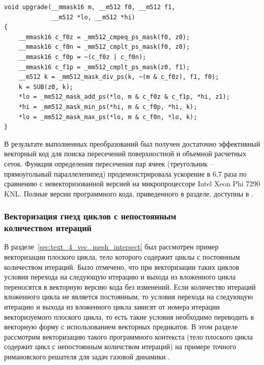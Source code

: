 \begin{singlespace}
\begin{lstlisting}[caption={Векторная реализация функции upgrade с пропагированным условием вызова внутрь функции.},label={lst:text_4_mesh_intersect_upgrade}]
void upgrade(__mmask16 m, __m512 f0, __m512 f1,
             __m512 *lo, __m512 *hi)
{
    __mmask16 c_f0z = _mm512_cmpeq_ps_mask(f0, z0);
    __mmask16 c_f0n = _mm512_cmplt_ps_mask(f0, z0);
    __mmask16 c_f0p = ~(c_f0z | c_f0n);
    __mmask16 c_f1p = _mm512_cmplt_ps_mask(z0, f1);
    __m512 k = _mm512_mask_div_ps(k, ~(m & c_f0z), f1, f0);
    k = SUB(z0, k);
    *lo = _mm512_mask_add_ps(*lo, m & c_f0z & c_f1p, *hi, z1);
    *hi = _mm512_mask_min_ps(*hi, m & c_f0p, *hi, k);
    *lo = _mm512_mask_max_ps(*lo, m & c_f0n, *lo, k);
}
\end{lstlisting}
\end{singlespace}

В результате выполненных преобразований был получен достаточно эффективный векторный код для поиска пересечений поверхностной и объемной расчетных сеток.
Функция определения пересечения пар ячеек (треугольник -- прямоугольный параллелепипед) продемонстрировала ускорение в 6,7 раза по сравнению с невекторизованной версией на микропроцессоре Intel Xeon Phi 7290 KNL\label{abbr:knl12}.
Полные версии программного кода, приведенного в разделе, доступны в \cite{iparGithub}.

\subsubsection{Векторизация гнезд циклов с непостоянным \\ количеством итераций}\label{sec:text_4_vec_riemann}

В разделе~\ref{sec:text_4_vec_mesh_intersect} был рассмотрен пример векторизации плоского цикла, тело которого содержит циклы с постоянным количеством итераций.
Было отмечено, что при векторизации таких циклов условия перехода на следующую итерацию и выхода из вложенного цикла переносятся в векторную версию кода без изменений.
Если количество итераций вложенного цикла не является постоянным, то условия перехода на следующую итерацию и выхода из вложенного цикла зависят от номера итерации векторизуемого плоского цикла, то есть такие условия необходимо переводить в векторную форму с использованием векторных предикатов\label{term:vector_mask7}.
В этом разделе рассмотрим векторизацию\label{term:vectorization4} такого программного контекста (тело плоского цикла содержит цикл с непостоянным количством итераций) на примере точного римановского решателя\label{term:riemann_solver6} для задач газовой динамики \cite{Rybakov2019VecRiem1,Rybakov2019VecRiem2}.

